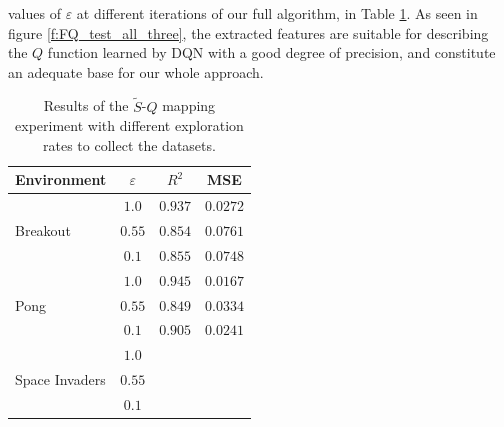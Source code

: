 values of $\varepsilon$ at different iterations of our full algorithm, in 
Table \ref{t:FQ_tests}.
As seen in figure \ref{f:FQ_test_all_three}, the extracted features are suitable
for describing the $Q$ function learned by DQN with a good degree of precision, 
and constitute an adequate base for our whole approach. 
%
\begin{table}
    \centering
    \begin{tabular}{l c c c} 
	\hline
	Environment                     & $\varepsilon$ & $R^2$   & MSE \\ 
	\hline 
	\multirow{3}{*}{Breakout}       & $1.0$         & $0.937$ & $0.0272$ \\
	                                & $0.55$        & $0.854$ & $0.0761$  \\
	                                & $0.1$         & $0.855$ & $0.0748$ \\
	\hline
	\multirow{3}{*}{Pong}           & $1.0$         & $0.945$ & $0.0167$ \\
	                                & $0.55$        & $0.849$ & $0.0334$ \\
	                                & $0.1$         & $0.905$ & $0.0241$ \\
	\hline
	\multirow{3}{*}{Space Invaders} & $1.0$         & $ $     & $ $ \\
	                                & $0.55$        & $ $     & $ $ \\
	                                & $0.1$         & $ $     & $ $ \\
	\hline
    \end{tabular}
    \caption[Results of $\tilde{S}$-$Q$ mapping experiment]{Results of the 
	     $\tilde{S}$-$Q$ mapping experiment with different exploration rates
	     to collect the datasets.}
    \label{t:FQ_tests}
\end{table}
%
%
